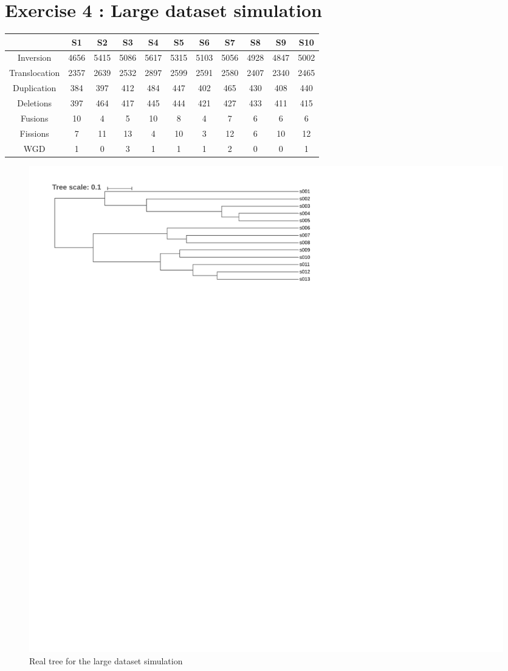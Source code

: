 \documentclass[]{article}
\theoremstyle{definition}
\begin{document}
\section{Exercise 4 : Large dataset simulation}
\begin{center}
	\begin{tabular}{|*{11}{c|}}
		\hline
		& S1& S2  & S3  & S4 & S5
		& S6& S7 & S8 & S9 & S10 \\
		\hline
		Inversion     &4656&5415&5086&5617&5315&5103&5056&4928&4847&5002 \\
		\hline
		Translocation &2357&2639&2532&2897&2599&2591&2580&2407&2340&2465 \\
		\hline
		Duplication   &384 &397 &412 &484 &447 &402 &465 &430 &408 &440  \\
		\hline
		Deletions     &397 &464 &417 &445 &444 &421 &427 &433 &411 &415  \\
		\hline
		Fusions       &10  &4   &5   &10  &8   &4   &7   &6   &6   &6    \\
		\hline
		Fissions      &7   &11  &13  &4   &10  &3   &12  &6   &10  &12   \\
		\hline
		WGD           &1   &0   &3   &1   &1   &1   &2   &0   &0   &1    \\
		\hline
	\end{tabular}
\end{center}

\begin{figure}[H]
	\includegraphics*[width = \linewidth]{image/big_sim_tree_true.pdf}
	\caption{ Real tree for the large dataset simulation }
\end{figure}
\end{document}

